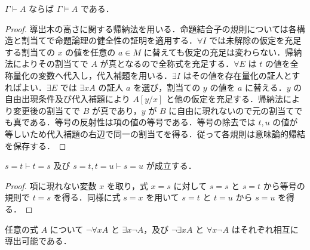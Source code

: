 \begin{prop}[一階論理の健全性]
$\Gamma\vdash A$ ならば $\Gamma\models A$ である．
\end{prop}
\begin{proof}
導出木の高さに関する帰納法を用いる．命題結合子の規則については各構造と割当てで命題論理の健全性の証明を適用する．$\forall I$ では未解除の仮定を充足する割当ての $x$ の値を任意の $a\in M$ に替えても仮定の充足は変わらない．帰納法によりその割当てで $A$ が真となるので全称式を充足する．$\forall E$ は $t$ の値を全称量化の変数へ代入し，代入補題を用いる．$\exists I$ はその値を存在量化の証人とすればよい．$\exists E$ では $\exists x A$ の証人 $a$ を選び，割当ての $y$ の値を $a$ に替える．$y$ の自由出現条件及び代入補題により $A[y/x]$ と他の仮定を充足する．帰納法により変更後の割当てで $B$ が真であり，$y$ が $B$ に自由に現れないので元の割当てでも真である．等号の反射性は項の値の等号である．等号の除去では $t,u$ の値が等しいため代入補題の右辺で同一の割当てを得る．従って各規則は意味論的帰結を保存する．
\end{proof}
\begin{prop}[等号の対称性と推移性]
$s=t\vdash t=s$ 及び $s=t,t=u\vdash s=u$ が成立する．
\end{prop}
\begin{proof}
項に現れない変数 $x$ を取り，式 $x=s$ に対して $s=s$ と $s=t$ から等号の規則で $t=s$ を得る．同様に式 $s=x$ を用いて $s=t$ と $t=u$ から $s=u$ を得る．
\end{proof}
\begin{prop}[量化子の双対性]
任意の式 $A$ について $\neg\forall x A$ と $\exists x\neg A$，及び $\neg\exists x A$ と $\forall x\neg A$ はそれぞれ相互に導出可能である．
\end{prop}
